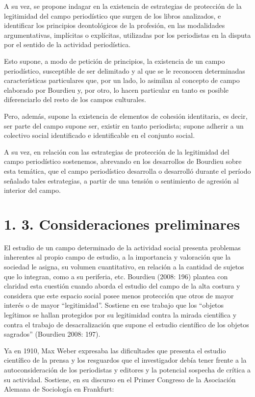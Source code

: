 {A su vez, se propone indagar en la existencia de estrategias de protección de la legitimidad del campo periodístico que surgen de los libros analizados, e identificar los principios deontológicos de la profesión, en las modalidades argumentativas, implícitas o explícitas, utilizadas por los periodistas en la disputa por el sentido de la actividad periodística.

Esto supone, a modo de petición de principios, la existencia de un campo periodístico, susceptible de ser delimitado y al que se le reconocen determinadas características particulares que, por un lado, lo asimilan al concepto de campo elaborado por Bourdieu y, por otro, lo hacen particular en tanto es posible diferenciarlo del resto de los campos culturales.

Pero, además, supone la existencia de elementos de cohesión identitaria, es decir, ser parte del campo supone ser, existir en tanto periodista; supone adherir a un colectivo social identificado e identificable en el conjunto social.

A su vez, en relación con las estrategias de protección de la legitimidad del campo periodístico sostenemos, abrevando en los desarrollos de Bourdieu sobre esta temática, que el campo periodístico desarrolla o desarrolló durante el período señalado tales estrategias, a partir de una tensión o sentimiento de agresión al interior del campo.

\section{1. 3. Consideraciones preliminares}

El estudio de un campo determinado de la actividad social presenta problemas inherentes al propio campo de estudio, a la importancia y valoración que la sociedad le asigna, su volumen cuantitativo, en relación a la cantidad de sujetos que lo integran, como a su periferia, etc. Bourdieu (2008: 196) plantea con claridad esta cuestión cuando aborda el estudio del campo de la alta costura y considera que este espacio social posee menos protección que otros de mayor interés o de mayor ``legitimidad''. Sostiene en ese trabajo que los ``objetos legítimos se hallan protegidos por su legitimidad contra la mirada científica y contra el trabajo de desacralización que supone el estudio científico de los objetos sagrados'' (Bourdieu 2008: 197).

Ya en 1910, Max Weber expresaba las dificultades que presenta el estudio científico de la prensa y los resguardos que el investigador debía tener frente a la autoconsideración de los periodistas y editores y la potencial sospecha de crítica a su actividad. Sostiene, en su discurso en el Primer Congreso de la Asociación Alemana de Sociología en Frankfurt:

}
